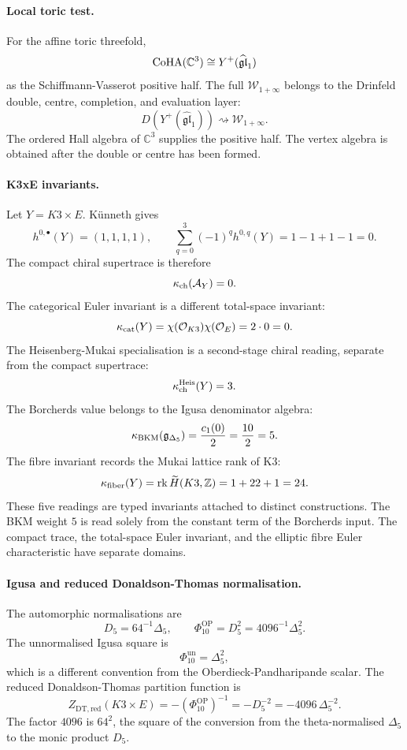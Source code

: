 \paragraph{Local toric test.}
For the affine toric threefold,
\[
  \mathrm{CoHA}(\mathbb C^3)
  \cong
  Y^+(\widehat{\mathfrak{gl}}_1)
\]
as the Schiffmann-Vasserot positive half.  The full
\(\mathcal W_{1+\infty}\) belongs to the Drinfeld double, centre,
completion, and evaluation layer:
\[
  D\!\left(Y^+(\widehat{\mathfrak{gl}}_1)\right)
  \rightsquigarrow
  \mathcal W_{1+\infty}.
\]
The ordered Hall algebra of \(\mathbb C^3\) supplies the positive half.
The vertex algebra is obtained after the double or centre has been
formed.

\paragraph{K3xE invariants.}
Let \(Y=K3\times E\).  K\"unneth gives
\[
  h^{0,\bullet}(Y)=(1,1,1,1),
  \qquad
  \sum_{q=0}^{3}(-1)^q h^{0,q}(Y)=1-1+1-1=0.
\]
The compact chiral supertrace is therefore
\[
  \kappa_{\mathrm{ch}}(\mathcal A_Y)=0.
\]
The categorical Euler invariant is a different total-space invariant:
\[
  \kappa_{\mathrm{cat}}(Y)
  =
  \chi(\mathcal O_{K3})\chi(\mathcal O_E)
  =
  2\cdot 0
  =
  0.
\]
The Heisenberg-Mukai specialisation is a second-stage chiral reading,
separate from the compact supertrace:
\[
  \kappa_{\mathrm{ch}}^{\mathrm{Heis}}(Y)=3.
\]
The Borcherds value belongs to the Igusa denominator algebra:
\[
  \kappa_{\mathrm{BKM}}(\mathfrak g_{\Delta_5})
  =
  \frac{c_1(0)}{2}
  =
  \frac{10}{2}
  =
  5.
\]
The fibre invariant records the Mukai lattice rank of K3:
\[
  \kappa_{\mathrm{fiber}}(Y)
  =
  \mathrm{rk}\,\widetilde H(K3,\mathbb Z)
  =
  1+22+1
  =
  24.
\]
These five readings are typed invariants attached to distinct
constructions.  The BKM weight \(5\) is
read solely from the constant term of the Borcherds input.  The compact
trace, the total-space Euler invariant, and the elliptic fibre Euler
characteristic have separate domains.

\paragraph{Igusa and reduced Donaldson-Thomas normalisation.}
The automorphic normalisations are
\[
  D_5=64^{-1}\Delta_5,\qquad
  \Phi_{10}^{\mathrm{OP}}
  =
  D_5^2
  =
  4096^{-1}\Delta_5^2.
\]
The unnormalised Igusa square is
\[
  \Phi_{10}^{\mathrm{un}}=\Delta_5^2,
\]
which is a different convention from the Oberdieck-Pandharipande scalar.
The reduced Donaldson-Thomas partition function is
\[
  Z_{\mathrm{DT,red}}(K3\times E)
  =
  -(\Phi_{10}^{\mathrm{OP}})^{-1}
  =
  -D_5^{-2}
  =
  -4096\,\Delta_5^{-2}.
\]
The factor \(4096\) is \(64^2\), the square of the conversion from the
theta-normalised \(\Delta_5\) to the monic product \(D_5\).

